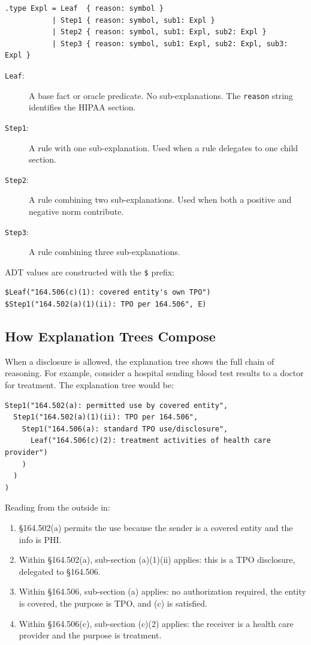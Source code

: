 \documentclass[11pt,letterpaper]{article}
\begin{document}
\begin{lstlisting}[style=soufflestyle,caption={The Expl ADT from hipaa\_types.dl}]
.type Expl = Leaf  { reason: symbol }
           | Step1 { reason: symbol, sub1: Expl }
           | Step2 { reason: symbol, sub1: Expl, sub2: Expl }
           | Step3 { reason: symbol, sub1: Expl, sub2: Expl, sub3: Expl }
\end{lstlisting}

\begin{description}
  \item[\texttt{Leaf}:] A base fact or oracle predicate. No sub-explanations. The \texttt{reason} string identifies the HIPAA section.
  \item[\texttt{Step1}:] A rule with one sub-explanation. Used when a rule delegates to one child section.
  \item[\texttt{Step2}:] A rule combining two sub-explanations. Used when both a positive and negative norm contribute.
  \item[\texttt{Step3}:] A rule combining three sub-explanations.
\end{description}

ADT values are constructed with the \texttt{\$} prefix:
\begin{lstlisting}[style=soufflestyle]
$Leaf("164.506(c)(1): covered entity's own TPO")
$Step1("164.502(a)(1)(ii): TPO per 164.506", E)
\end{lstlisting}

\subsection{How Explanation Trees Compose}

When a disclosure is allowed, the explanation tree shows the full chain of reasoning. For example, consider a hospital sending blood test results to a doctor for treatment. The explanation tree would be:

\begin{verbatim}
Step1("164.502(a): permitted use by covered entity",
  Step1("164.502(a)(1)(ii): TPO per 164.506",
    Step1("164.506(a): standard TPO use/disclosure",
      Leaf("164.506(c)(2): treatment activities of health care provider")
    )
  )
)
\end{verbatim}

Reading from the outside in:
\begin{enumerate}
  \item \S 164.502(a) permits the use because the sender is a covered entity and the info is PHI.
  \item Within \S 164.502(a), sub-section (a)(1)(ii) applies: this is a TPO disclosure, delegated to \S 164.506.
  \item Within \S 164.506, sub-section (a) applies: no authorization required, the entity is covered, the purpose is TPO, and (c) is satisfied.
  \item Within \S 164.506(c), sub-section (c)(2) applies: the receiver is a health care provider and the purpose is treatment.
\end{enumerate}
\end{document}
